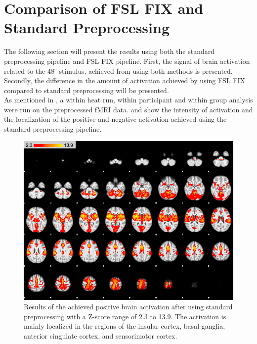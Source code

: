 \section{Comparison of FSL FIX and Standard Preprocessing}\label{sec:comp}

The following section will present the results using both the standard preprocessing pipeline and FSL FIX pipeline. First, the signal of brain activation related to the 48$^\circ$ stimulus, achieved from using both methods is presented. Secondly, the difference in the amount of activation achieved by using FSL FIX compared to standard preprocessing will be presented. \\
As mentioned in , a within heat run, within participant and within group analysis were run on the preprocessed fMRI data.  and  show the intensity of activation and the localization of the positive and negative activation achieved using the standard preprocessing pipeline.  


\begin{figure}[H]                 
	\includegraphics[width=.65\textwidth]{figures/Results/STD_pos}  
	\caption{Results of the achieved positive brain activation after using standard preprocessing with a Z-score range of 2.3 to 13.9. The activation is mainly localized in the regions of the insular cortex, basal ganglia, anterior cingulate cortex, and sensorimotor cortex.}
	\label{fig:res:stdpos} 
\end{figure}

